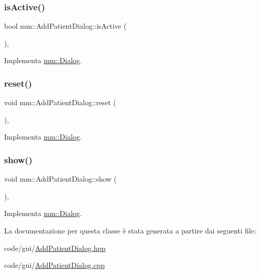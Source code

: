 \subsubsection{\texorpdfstring{is\+Active()}{isActive()}}
{\footnotesize\ttfamily bool mm\+::\+Add\+Patient\+Dialog\+::is\+Active (\begin{DoxyParamCaption}{ }\end{DoxyParamCaption})\hspace{0.3cm}{\ttfamily [override]}, {\ttfamily [virtual]}}



Implementa \mbox{\hyperlink{classmm_1_1_dialog_a22abaf4e90b6fdca5c20039f6b9e15ac}{mm\+::\+Dialog}}.

\mbox{\label{classmm_1_1_add_patient_dialog_a64c8c2ea3b1c69a858f4eaec1854270a}} 
\subsubsection{\texorpdfstring{reset()}{reset()}}
{\footnotesize\ttfamily void mm\+::\+Add\+Patient\+Dialog\+::reset (\begin{DoxyParamCaption}{ }\end{DoxyParamCaption})\hspace{0.3cm}{\ttfamily [override]}, {\ttfamily [virtual]}}



Implementa \mbox{\hyperlink{classmm_1_1_dialog_abe6e5ac072c12c06971f60491f079d80}{mm\+::\+Dialog}}.

\mbox{\label{classmm_1_1_add_patient_dialog_a0247912794984eb19c43842ab9037708}} 
\subsubsection{\texorpdfstring{show()}{show()}}
{\footnotesize\ttfamily void mm\+::\+Add\+Patient\+Dialog\+::show (\begin{DoxyParamCaption}{ }\end{DoxyParamCaption})\hspace{0.3cm}{\ttfamily [override]}, {\ttfamily [virtual]}}



Implementa \mbox{\hyperlink{classmm_1_1_dialog_afda4b0dc7c0ac027c4b8fdb95713700f}{mm\+::\+Dialog}}.



La documentazione per questa classe è stata generata a partire dai seguenti file\+:\begin{DoxyCompactItemize}
\item 
code/gui/\mbox{\hyperlink{_add_patient_dialog_8hpp}{Add\+Patient\+Dialog.\+hpp}}\item 
code/gui/\mbox{\hyperlink{_add_patient_dialog_8cpp}{Add\+Patient\+Dialog.\+cpp}}\end{DoxyCompactItemize}
